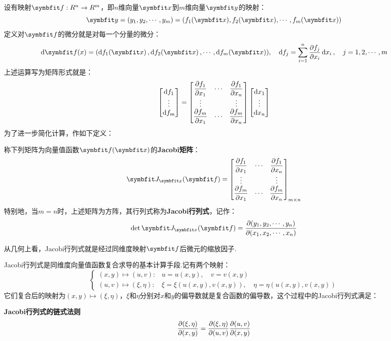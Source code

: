 设有映射$\vb{f}:\mathbb{R}^n \to \mathbb{R}^m$，即$n$维向量$\vb{x}$到$m$维向量$\vb{y}$的映射：
\[\vb{y} = (y_1,y_2,\cdots,y_m) = (f_1(\vb x),f_2(\vb x),\cdots,f_m(\vb x))\]
定义对$\vb{f}$的微分就是对每一个分量的微分：
\[\dd{\vb{f(x)}} = (\dd{f_1(\vb{x})},\dd{f_2(\vb{x})},\cdots,\dd{f_m(\vb{x})}),\quad\dd{f_j} = \sum_{i=1}^{n}\pdv{f_j}{x_i}\dd{x_i},\quad j = 1,2,\cdots,m\]
上述运算写为矩阵形式就是：
\[\begin{bmatrix}
    \dd{f_1} \\ \vdots \\ \dd{f_m}
\end{bmatrix} = \begin{bmatrix}
    \displaystyle\pdv{f_1}{x_1} & \cdots & \displaystyle\pdv{f_1}{x_n} \\
    \vdots & & \vdots \\
    \displaystyle\pdv{f_m}{x_1} & \cdots & \displaystyle\pdv{f_m}{x_n} \\
\end{bmatrix} \begin{bmatrix}
        \dd{x_1} \\ \vdots \\ \dd{x_n}
\end{bmatrix}\]
为了进一步简化计算，作如下定义：
\begin{definition}
    称下列矩阵为向量值函数$\vb{f(\vb{x})}$的\textbf{Jacobi矩阵}：
    \[\vb{J}_{\vb x}(\vb f) = \begin{bmatrix}
    \displaystyle\pdv{f_1}{x_1} & \cdots & \displaystyle\pdv{f_1}{x_n} \\
    \vdots & & \vdots \\
    \displaystyle\pdv{f_m}{x_1} & \cdots & \displaystyle\pdv{f_m}{x_n} \\
    \end{bmatrix}_{m \times n}\]
    特别地，当$m=n$时，上述矩阵为方阵，其行列式称为\textbf{Jacobi行列式}，记作：
    \[\det\vb{J}_{\vb{x}}(\vb{f}) = \pdv{(y_1,y_2,\cdots,y_n)}{(x_1,x_2,\cdots,x_n)}\]
\end{definition}
从几何上看，Jacobi行列式就是经过同维度映射$\vb{f}$后微元的缩放因子.

Jacobi行列式是同维度向量值函数复合求导的基本计算手段.记有两个映射：
\[\begin{cases}
    (x,y)\mapsto(u,v):& u = u(x,y),\quad v = v(x,y)\\
    (u,v)\mapsto(\xi,\eta):& \xi = \xi(u(x,y),v(x,y)),\quad \eta = \eta(u(x,y),v(x,y))
\end{cases}\]
它们复合后的映射为$(x,y)\mapsto(\xi,\eta)$，$\xi$和$\eta$分别对$x$和$y$的偏导数就是复合函数的偏导数，这个过程中的Jacobi行列式满足：
\begin{theorem}
    \textbf{Jacobi行列式的链式法则}
    \[\pdv{(\xi,\eta)}{(x,y)} = \pdv{(\xi,\eta)}{(u,v)}\pdv{(u,v)}{(x,y)}\]
\end{theorem}


